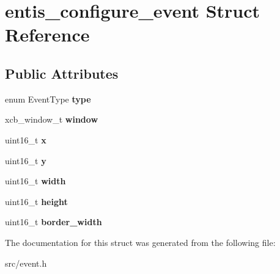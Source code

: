 \hypertarget{structentis__configure__event}{}\section{entis\+\_\+configure\+\_\+event Struct Reference}
\label{structentis__configure__event}
\subsection*{Public Attributes}
\begin{DoxyCompactItemize}
\item 
\mbox{\label{structentis__configure__event_ac77fc6d2b2d6f0e5635feea39d912365}} 
enum Event\+Type {\bfseries type}
\item 
\mbox{\label{structentis__configure__event_afa4ca30b8d7d14dda2e1be88aaf20d47}} 
xcb\+\_\+window\+\_\+t {\bfseries window}
\item 
\mbox{\label{structentis__configure__event_ab0d1d49096bffb326ca0877188096cdd}} 
uint16\+\_\+t {\bfseries x}
\item 
\mbox{\label{structentis__configure__event_ab7bad3c677925aa3d374228bd5506ba8}} 
uint16\+\_\+t {\bfseries y}
\item 
\mbox{\label{structentis__configure__event_a87fc4bff891480c6df1085c5f7d9c66e}} 
uint16\+\_\+t {\bfseries width}
\item 
\mbox{\label{structentis__configure__event_a5f6140e92335607d68a30cbdd34b76da}} 
uint16\+\_\+t {\bfseries height}
\item 
\mbox{\label{structentis__configure__event_aa16b5e7b325b1fef479ac175eada817f}} 
uint16\+\_\+t {\bfseries border\+\_\+width}
\end{DoxyCompactItemize}


The documentation for this struct was generated from the following file\+:\begin{DoxyCompactItemize}
\item 
src/event.\+h\end{DoxyCompactItemize}

